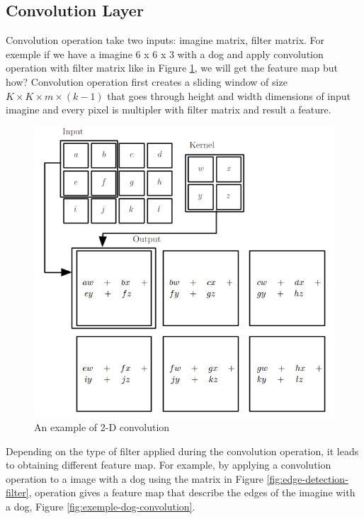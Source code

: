 \subsection{Convolution Layer}

Convolution operation take two inputs: imagine matrix, filter matrix.  
For exemple if we have a imagine 6 x 6 x 3 with a dog and apply convolution operation with filter matrix like in Figure \ref{fig:exemple-2d-convolution},  we will get the feature map but how?
Convolution operation first creates a sliding window of size $K \times K \times m \times (k-1)$ that goes through height and width dimensions of input imagine 
and every pixel is multipler with filter matrix and result a feature. \cite{Mallat:2008:WTS:1525499}

 \begin{figure}[htbp]
  \centerline{\includegraphics[scale=0.45]{fig/convolution+op.PNG}}  
  \caption{An example of 2-D convolution \cite{Mallat:2008:WTS:1525499}}
  \label{fig:exemple-2d-convolution}
\end{figure}

Depending on the type of filter applied during the convolution operation, it leads to obtaining different feature map.
For example, by applying a convolution operation to  a image with a dog  using the matrix 
in Figure \ref{fig:edge-detection-filter}, operation gives a feature map that describe the edges of the
imagine with a dog, Figure \ref{fig:exemple-dog-convolution}.

